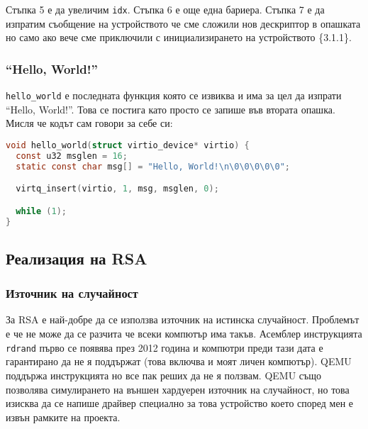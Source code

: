 Стъпка 5 е да увеличим {\tt idx}. Стъпка 6 е още една бариера. Стъпка 7 е да изпратим съобщение на устройството че сме сложили нов дескриптор в опашката но само ако вече сме приключили с инициализирането на устройството \{3.1.1\}.


\subsubsection{``Hello, World!''}
{\tt hello\_world} е последната функция която се извиква и има за цел да изпрати ``Hello, World!''. Това се постига като просто се запише във втората опашка. Мисля че кодът сам говори за себе си:
\begin{lstlisting}[language=C]
void hello_world(struct virtio_device* virtio) {
  const u32 msglen = 16;
  static const char msg[] = "Hello, World!\n\0\0\0\0\0";

  virtq_insert(virtio, 1, msg, msglen, 0);

  while (1);
}
\end{lstlisting}

\subsection{Реализация на RSA}
\subsubsection{Източник на случайност}
За RSA е най-добре да се използва източник на истинска случайност. Проблемът е че не може да се разчита че всеки компютър има такъв. Асемблер инструкцията {\tt rdrand} първо се появява през 2012 година и компютри преди тази дата е гарантирано да не я поддържат (това включва и моят личен компютър). QEMU поддържа инструкцията но все пак реших да не я ползвам. QEMU също позволява симулирането на външен хардуерен източник на случайност, но това изисква да се напише драйвер специално за това устройство което според мен е извън рамките на проекта.


